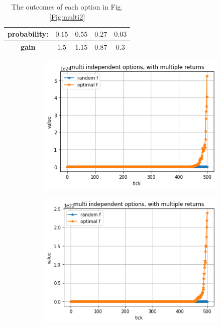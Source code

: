 \documentclass{article}
\begin{document}
	\newpage
	
		\begin{table}[!h]
		\centering\begin{tabular}{|c||c|c|c|c|}
			\hline
			\textbf{probability:} & $0.15$ & $0.55$ & $0.27$ & $0.03$ \\ 
			\hline
			\textbf{gain} & $1.5$ & $1.15$ & $0.87$ & $0.3$  \\
			\hline
		\end{tabular}
		\caption{The outcomes of each option in Fig.\ref{Fig:multi2}}
		\label{table:options2}
	\end{table}
	
	
	\begin{figure}[!h]
		\begin{subfigure}{0.525\textwidth}
			\includegraphics[width=0.9\linewidth]{multi2-1} 
		\end{subfigure}
		\begin{subfigure}{0.525\textwidth}
			\includegraphics[width=0.9\linewidth]{multi2-2}

\end{subfigure}
\end{figure}
\end{document}
